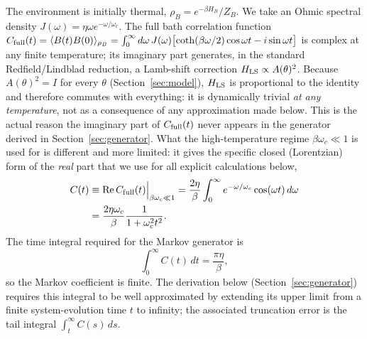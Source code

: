 \documentclass[aps,pra,reprint,superscriptaddress,nofootinbib,longbibliography]{revtex4-2}
\begin{document}
The environment is initially thermal, $\rho_B=e^{-\beta H_B}/Z_B$. We
take an Ohmic spectral density $J(\omega)=\eta\omega e^{-\omega/\omega_c}$.
The full bath correlation function
$C_{\rm full}(t)=\langle B(t)B(0)\rangle_{\rho_B}
=\int_0^\infty d\omega\,J(\omega)\bigl[\coth(\beta\omega/2)\cos\omega t
-i\sin\omega t\bigr]$
is complex at any finite temperature; its imaginary part generates,
in the standard Redfield/Lindblad reduction, a Lamb-shift correction
$H_{\rm LS}\propto A(\theta)^2$. Because $A(\theta)^2=I$ for every
$\theta$ (Section~\ref{sec:model}), $H_{\rm LS}$ is proportional to
the identity and therefore commutes with everything: it is
dynamically trivial \emph{at any temperature}, not as a consequence of
any approximation made below. This is the actual reason the imaginary
part of $C_{\rm full}(t)$ never appears in the generator derived in
Section~\ref{sec:generator}. What the high-temperature regime
$\beta\omega_c\ll1$ is used for is different and more limited: it
gives the specific closed (Lorentzian) form of the \emph{real} part
that we use for all explicit calculations below,
\begin{align}
C(t)&\equiv{\rm Re}\,C_{\rm full}(t)\Big|_{\beta\omega_c\ll1}
=\frac{2\eta}{\beta}\int_0^\infty e^{-\omega/\omega_c}\cos(\omega t)\,d\omega
\notag\\
&= \frac{2\eta\omega_c}{\beta}\frac{1}{1+\omega_c^2t^2}.
\label{eq:Ct}
\end{align}
The time integral required for the Markov generator is
\begin{equation}
\int_0^\infty C(t)\,dt = \frac{\pi\eta}{\beta},
\label{eq:intC}
\end{equation}
so the Markov coefficient is finite. The derivation below (Section~\ref{sec:generator})
requires this integral to be well approximated by extending its upper
limit from a finite system-evolution time $t$ to infinity; the
associated truncation error is the tail integral $\int_t^\infty C(s)\,ds$.
\end{document}
